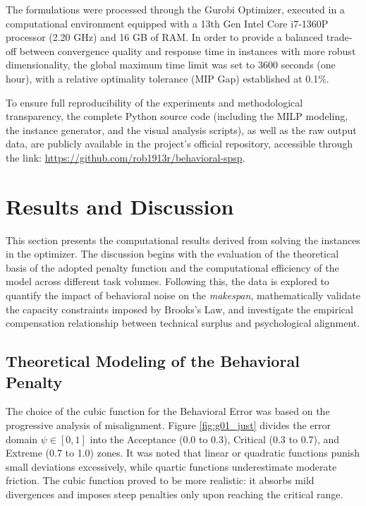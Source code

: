 \documentclass[a4paper,11pt]{article}
\begin{document}
The formulations were processed through the Gurobi Optimizer, executed in a 
computational environment equipped with a 13th Gen Intel Core i7-1360P 
processor (2.20 GHz) and 16 GB of RAM. In order to provide a balanced trade-off 
between convergence quality and response time in instances with more robust 
dimensionality, the global maximum time limit was set to 3600 seconds (one 
hour), with a relative optimality tolerance (MIP Gap) established at 0.1\%.

To ensure full reproducibility of the experiments and methodological 
transparency, the complete Python source code (including the MILP modeling, 
the instance generator, and the visual analysis scripts), as well as the raw 
output data, are publicly available in the project's official repository, 
accessible through the link: \url{https://github.com/rob1913r/behavioral-spsp}.

\section{Results and Discussion}

This section presents the computational results derived from solving the 
instances in the optimizer. The discussion begins with the evaluation of the 
theoretical basis of the adopted penalty function and the computational 
efficiency of the model across different task volumes. Following this, the 
data is explored to quantify the impact of behavioral noise on the 
\textit{makespan}, mathematically validate the capacity constraints imposed 
by Brooks's Law, and investigate the empirical compensation relationship 
between technical surplus and psychological alignment.

\subsection{Theoretical Modeling of the Behavioral Penalty}

The choice of the cubic function for the Behavioral Error was based on the 
progressive analysis of misalignment. Figure \ref{fig:g01_just} divides the 
error domain $\psi \in [0, 1]$ into the Acceptance (0.0 to 0.3), Critical 
(0.3 to 0.7), and Extreme (0.7 to 1.0) zones. It was noted that linear or 
quadratic functions punish small deviations excessively, while quartic 
functions underestimate moderate friction. The cubic function proved to be 
more realistic: it absorbs mild divergences and imposes steep penalties 
only upon reaching the critical range. 
\end{document}

